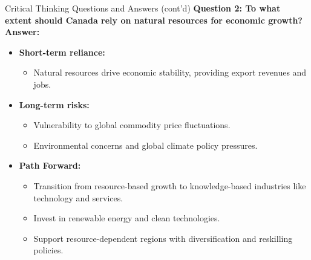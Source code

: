 \begin{frame}{Critical Thinking Questions and Answers (cont'd)}
  \textbf{Question 2: To what extent should Canada rely on natural resources for economic growth?}
  \pause
  \textbf{Answer:}
  \begin{itemize}
    \item \textbf{Short-term reliance:}
      \begin{itemize}
        \item Natural resources drive economic stability, providing export revenues and jobs.
      \end{itemize}
    \item \textbf{Long-term risks:}
      \begin{itemize}
        \item Vulnerability to global commodity price fluctuations.
        \item Environmental concerns and global climate policy pressures.
      \end{itemize}
    \item \textbf{Path Forward:}
      \begin{itemize}
        \item Transition from resource-based growth to knowledge-based industries like technology and services.
        \item Invest in renewable energy and clean technologies.
        \item Support resource-dependent regions with diversification and reskilling policies.
      \end{itemize}
  \end{itemize}
\end{frame}

